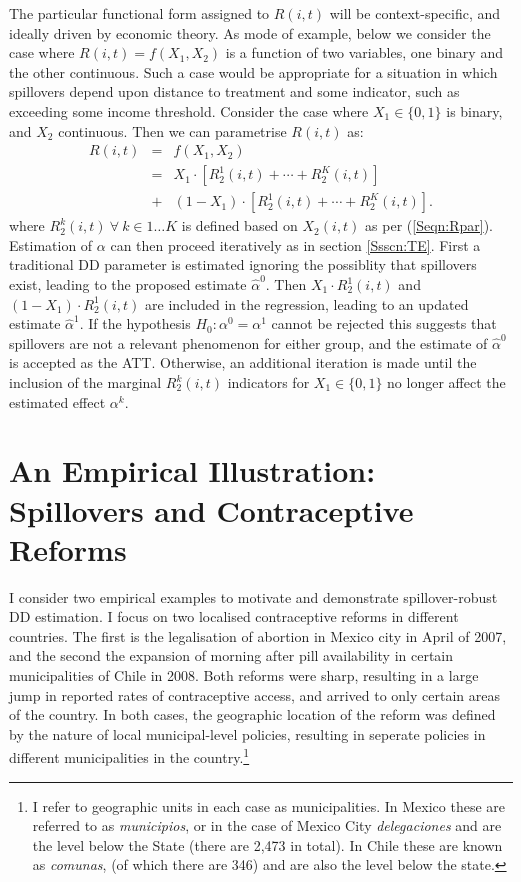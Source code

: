 The particular functional form assigned to $R(i,t)$ will be context-specific,
and ideally driven by economic theory.  As mode of example, below we consider the
case where $R(i,t)=f(X_1,X_2)$ is a function of two variables, one binary and
the other continuous.  Such a case would be appropriate for a situation in which
spillovers depend upon distance to treatment and some indicator, such as exceeding
some income threshold.  Consider the case where $X_1\in \{0,1\}$ is binary, and 
$X_2$ continuous.  Then we can parametrise $R(i,t)$ as:
\begin{eqnarray}
R(i,t)&=&f(X_1,X_2) \nonumber \\
      &=&X_1     \cdot[R_2^1(i,t)+ \cdots + R_2^K(i,t)]  \nonumber \\
      &+&(1-X_1) \cdot[R_2^1(i,t)+ \cdots + R_2^K(i,t)]. \nonumber
\end{eqnarray}
where $R_2^k(i,t)\ \forall\ k \in 1\ldots K$ is defined based on $X_2(i,t)$ as 
per (\ref{Seqn:Rpar}).  Estimation of $\alpha$ can then proceed iteratively as 
in section \ref{Ssscn:TE}.  First a traditional DD parameter is estimated 
ignoring the possiblity that spillovers exist, leading to the proposed estimate 
$\hat\alpha^0$.  Then $X_1\cdot R_2^1(i,t)$ and $(1-X_1)\cdot R_2^1(i,t)$ are 
included in the regression, leading to 
an updated estimate $\hat\alpha^1$.  If the hypothesis $H_0: \alpha^0=\alpha^1$ 
cannot be rejected this suggests that spillovers are not a relevant phenomenon 
for either group, and the estimate of $\hat\alpha^0$ is accepted as the ATT.  
Otherwise, an additional iteration is made until the inclusion of the marginal 
$R_2^k(i,t)$ indicators for $X_1 \in \{0,1\}$ no longer affect the estimated 
effect $\alpha^k$.

\section{An Empirical Illustration: Spillovers and Contraceptive Reforms}
\label{Sscn:empirics}
I consider two empirical examples to motivate and demonstrate spillover-robust 
DD estimation.  I focus on two localised contraceptive reforms in different 
countries. The first is the legalisation of abortion in Mexico city in April of 
2007, and the second the expansion of morning after pill availability in certain 
municipalities of Chile in 2008.  Both reforms were sharp, resulting in a large 
jump in reported rates of contraceptive access, and arrived to only certain areas 
of the country.  In both cases, the geographic location of the reform was defined 
by the nature of local municipal-level policies, resulting in seperate policies 
in different municipalities in the country.\footnote{I refer to geographic units 
in each case as municipalities.  In Mexico these are referred to as 
\emph{municipios}, or in the case of Mexico City \emph{delegaciones} and are the 
level below the State (there are 2,473 in total).  In Chile these are known as 
\emph{comunas}, (of which there are 346) and are also the level below the state.}


